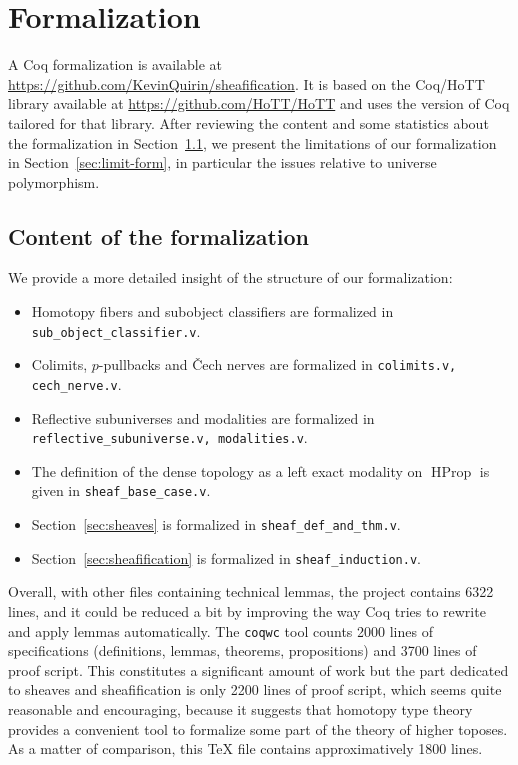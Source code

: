 \documentclass[conference]{IEEEtran}
\newcommand{\mynote}[2]{
    \fbox{\bfseries\sffamily\scriptsize#1}
    {\small$\blacktriangleright$\textsf{\emph{#2}}$\blacktriangleleft$}~}
\newcommand\nt[1]{\mynote{NT}{#1}}
\DeclareMathOperator{\HProp}{HProp}
\begin{document}

\section{Formalization} 
\label{sec:formalization}

A Coq formalization is available at
\url{https://github.com/KevinQuirin/sheafification}.
%
It is based on the Coq/HoTT library available at
\url{https://github.com/HoTT/HoTT} and uses the version of Coq
tailored for that library.
%
After reviewing the content and some statistics about the
formalization in Section~\ref{sec:cont-form}, we present the
limitations of our formalization in Section~\ref{sec:limit-form}, in
particular the issues relative to universe polymorphism. 

\subsection{Content of the formalization}
\label{sec:cont-form}

We provide a more detailed insight of the structure of our formalization:
\begin{itemize} 
\item  Homotopy fibers and subobject classifiers are formalized in
\texttt{sub\_object\_classifier.v}.%
%
\item Colimits, $p$-pullbacks and \v{C}ech nerves are formalized in
\texttt{colimits.v, cech\_nerve.v}.%
\item
Reflective subuniverses and modalities are formalized in
\texttt{reflective\_subuniverse.v, modalities.v}. %
\item 
%
  The definition of the dense topology as a left exact modality on
  $\HProp$ is given in \texttt{sheaf\_base\_case.v}. %
\item
Section~\ref{sec:sheaves} is formalized in
\texttt{sheaf\_def\_and\_thm.v}. %
\item
Section~\ref{sec:sheafification} is formalized in
\texttt{sheaf\_induction.v}. %
\end{itemize}

Overall, with other files containing technical lemmas, the project
contains 6322 lines, and it could be reduced a bit by improving the
way Coq tries to rewrite and apply lemmas automatically. 
The \texttt{coqwc} tool counts 2000 lines of specifications
(definitions, lemmas, theorems, propositions) and 3700 lines of proof
script.
%
This constitutes a significant amount of work but the part dedicated
to sheaves and sheafification is only 2200 lines of proof script,
which seems quite reasonable and encouraging, because it suggests
that homotopy type theory provides a convenient tool to formalize some
part of the theory of higher toposes. As a matter of comparison, this
\TeX\xspace file contains approximatively 1800 lines.
\end{document}
